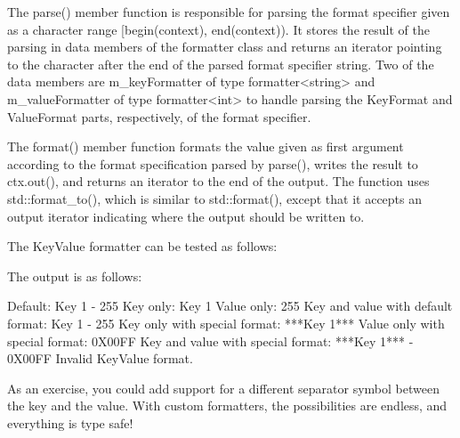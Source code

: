 The parse() member function is responsible for parsing the format specifier given as a character range [begin(context), end(context)). It stores the result of the parsing in data members of the formatter class and returns an iterator pointing to the character after the end of the parsed format specifier string. Two of the data members are m\_keyFormatter of type formatter<string> and m\_valueFormatter of type formatter<int> to handle parsing the KeyFormat and ValueFormat parts, respectively, of the format specifier.

The format() member function formats the value given as first argument according to the format specification parsed by parse(), writes the result to ctx.out(), and returns an iterator to the end of the output. The function uses std::format\_to(), which is similar to std::format(), except that it accepts an output iterator indicating where the output should be written to.

The KeyValue formatter can be tested as follows:


The output is as follows:

\begin{shell}
                          Default: Key 1 - 255
                         Key only: Key 1
                       Value only: 255
Key and value with default format: Key 1 - 255
     Key only with special format: ***Key 1***
   Value only with special format: 0X00FF
Key and value with special format: ***Key 1*** - 0X00FF
Invalid KeyValue format.
\end{shell}

As an exercise, you could add support for a different separator symbol between the key and the value. With custom formatters, the possibilities are endless, and everything is type safe!



















